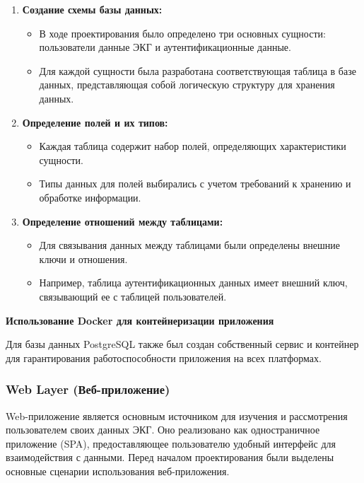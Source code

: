 \documentclass[12pt, russian]{extarticle}
\begin{document}
\begin{spacing}{1.5}
\begin{enumerate}
    \item \textbf{Создание схемы базы данных:}
        \begin{itemize}
            \item В ходе проектирования было определено три основных сущности: пользователи
                данные ЭКГ и аутентификационные данные.
            \item Для каждой сущности была разработана соответствующая таблица в базе данных,
                представляющая собой логическую структуру для хранения данных.
        \end{itemize}
    \item \textbf{Определение полей и их типов:}
        \begin{itemize}
            \item Каждая таблица содержит набор полей, определяющих характеристики сущности.
            \item Типы данных для полей выбирались с учетом требований к хранению и обработке информации.
        \end{itemize}
    \item \textbf{Определение отношений между таблицами:}
        \begin{itemize}
            \item Для связывания данных между таблицами были определены внешние ключи и отношения.
            \item Например, таблица аутентификационных данных имеет внешний ключ, связывающий ее с таблицей пользователей.
        \end{itemize}
\end{enumerate}

\par \noindent \textbf{Использование Docker для контейнеризации приложения}

Для базы данных PostgreSQL также был создан собственный сервис и контейнер для гарантирования работоспособности приложения на всех платформах.


\subsubsection{Web Layer (Веб-приложение)}

Web-приложение является основным источником для изучения и рассмотрения пользователем своих данных ЭКГ. Оно реализовано как одностраничное приложение (SPA), предоставляющее пользователю удобный интерфейс для взаимодействия с данными. Перед началом проектирования были выделены основные сценарии использования веб-приложения. 


\end{spacing}
\end{document}
